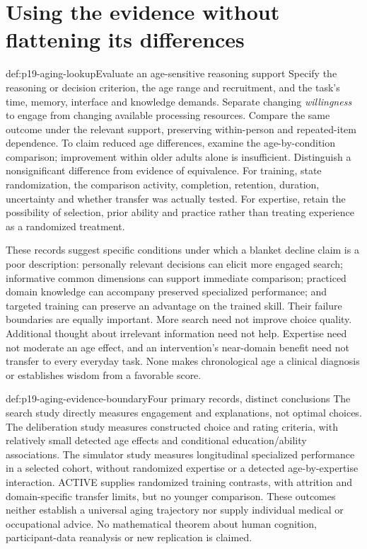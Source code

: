 \section{Using the evidence without flattening its differences}
\label{sec:p19-aging-use}

\begin{hbmethod}{def:p19-aging-lookup}{Evaluate an age-sensitive reasoning support}
Specify the reasoning or decision criterion, the age range and recruitment,
and the task's time, memory, interface and knowledge demands. Separate
changing \emph{willingness} to engage from changing available processing
resources. Compare the same outcome under the relevant support, preserving
within-person and repeated-item dependence. To claim reduced age
differences, examine the age-by-condition comparison; improvement within
older adults alone is insufficient. Distinguish a nonsignificant difference
from evidence of equivalence. For training, state randomization, the
comparison activity, completion, retention, duration, uncertainty and
whether transfer was actually tested. For expertise, retain the possibility
of selection, prior ability and practice rather than treating experience
as a randomized treatment.
\end{hbmethod}

These records suggest specific conditions under which a blanket decline
claim is a poor description: personally relevant decisions can elicit
more engaged search; informative common dimensions can support immediate
comparison; practiced domain knowledge can accompany preserved specialized
performance; and targeted training can preserve an advantage on the
trained skill. Their failure boundaries are equally important. More
search need not improve choice quality. Additional thought about
irrelevant information need not help. Expertise need not moderate an
age effect, and an intervention's near-domain benefit need not transfer
to every everyday task. None makes chronological age a clinical diagnosis
or establishes wisdom from a favorable score.

\begin{proofboundary}{def:p19-aging-evidence-boundary}{Four primary records, distinct conclusions}
The search study directly measures engagement and explanations, not optimal
choices. The deliberation study measures constructed choice and rating
criteria, with relatively small detected age effects and conditional
education/ability associations. The simulator study measures longitudinal
specialized performance in a selected cohort, without randomized expertise
or a detected age-by-expertise interaction. ACTIVE supplies randomized
training contrasts, with attrition and domain-specific transfer limits,
but no younger comparison. These outcomes neither establish a universal
aging trajectory nor supply individual medical or occupational advice.
No mathematical theorem about human cognition, participant-data reanalysis
or new replication is claimed.
\end{proofboundary}


